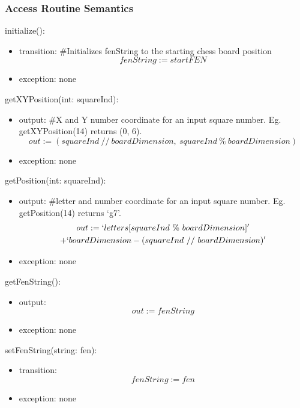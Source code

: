 \documentclass[12pt, titlepage]{article}
\begin{document}
    \subsubsection{Access Routine Semantics}
        \noindent initialize():
        \begin{itemize}
            \item transition: \#Initializes fenString to the starting chess board position \\
                \[fenString := startFEN\]
            \item exception: none
        \end{itemize}

        \noindent getXYPosition(int: squareInd):
        \begin{itemize}
            \item output: \#X and Y number coordinate for an input square number. 
                Eg. getXYPosition(14) returns (0, 6). \\
                \[out := (squareInd\ //\ boardDimension,\ squareInd\ \%\ boardDimension)\]
            \item exception: none
        \end{itemize}

        \noindent getPosition(int: squareInd):
        \begin{itemize}
            \item output: \#letter and number coordinate for an input square number.
                Eg. getPosition(14) returns `g7'. \\
                \begin{multline}
                    out := `letters[squareInd\ \%\ boardDimension]' \notag\\ 
                    + `boardDimension - (squareInd\ //\ boardDimension)'
                \end{multline}
                
            \item exception: none
        \end{itemize}

        \noindent getFenString():
        \begin{itemize}
            \item output: \[out := fenString\]
            \item exception: none
        \end{itemize}

        \noindent setFenString(string: fen):
        \begin{itemize}
            \item transition: \[fenString := fen\]
            \item exception: none
        \end{itemize}
\end{document}

